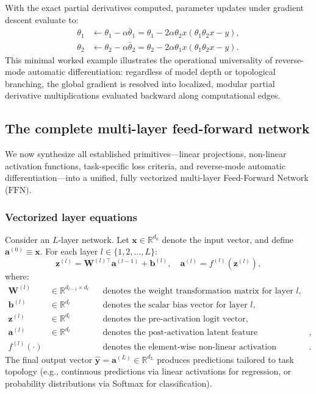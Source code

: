 \documentclass[../../main.tex]{subfiles}
\begin{document}
With the exact partial derivatives computed, parameter updates under gradient descent evaluate to:
\begin{align}
\theta_1 &\leftarrow \theta_1 - \alpha \bar{\theta}_1 = \theta_1 - 2\alpha \theta_2 x \left( \theta_1 \theta_2 x - y \right), \\
\theta_2 &\leftarrow \theta_2 - \alpha \bar{\theta}_2 = \theta_2 - 2\alpha \theta_1 x \left( \theta_1 \theta_2 x - y \right).
\end{align}
This minimal worked example illustrates the operational universality of reverse-mode automatic differentiation: regardless of model depth or topological branching, the global gradient is resolved into localized, modular partial derivative multiplications evaluated backward along computational edges.

\subsection{The complete multi-layer feed-forward network}
\label{subsec:complete_ffn_ensemble}

We now synthesize all established primitives—linear projections, non-linear activation functions, task-specific loss criteria, and reverse-mode automatic differentiation—into a unified, fully vectorized multi-layer Feed-Forward Network ($\text{FFN}$).

\subsubsection{Vectorized layer equations}

Consider an $L$-layer network. Let $\mathbf{x} \in \mathbb{R}^{d_0}$ denote the input vector, and define $\mathbf{a}^{(0)} \equiv \mathbf{x}$. For each layer $l \in \{1, 2, \dots, L\}$:
\begin{equation}
\mathbf{z}^{(l)} = \mathbf{W}^{(l)\top} \mathbf{a}^{(l-1)} + \mathbf{b}^{(l)}, \quad \mathbf{a}^{(l)} = f^{(l)}\left(\mathbf{z}^{(l)}\right),
\label{eq:ffn_layer_forward}
\end{equation}
where:
\begin{align}
\mathbf{W}^{(l)} &\in \mathbb{R}^{d_{l-1} \times d_l} && \text{denotes the weight transformation matrix for layer } l, \\
\mathbf{b}^{(l)} &\in \mathbb{R}^{d_l} && \text{denotes the scalar bias vector for layer } l, \\
\mathbf{z}^{(l)} &\in \mathbb{R}^{d_l} && \text{denotes the pre-activation logit vector}, \\
\mathbf{a}^{(l)} &\in \mathbb{R}^{d_l} && \text{denotes the post-activation latent feature representation}, \\
f^{(l)}(\cdot) & && \text{denotes the element-wise non-linear activation function}.
\end{align}
The final output vector $\hat{\mathbf{y}} = \mathbf{a}^{(L)} \in \mathbb{R}^{d_L}$ produces predictions tailored to task topology (e.g., continuous predictions via linear activations for regression, or probability distributions via Softmax for classification).
\end{document}
